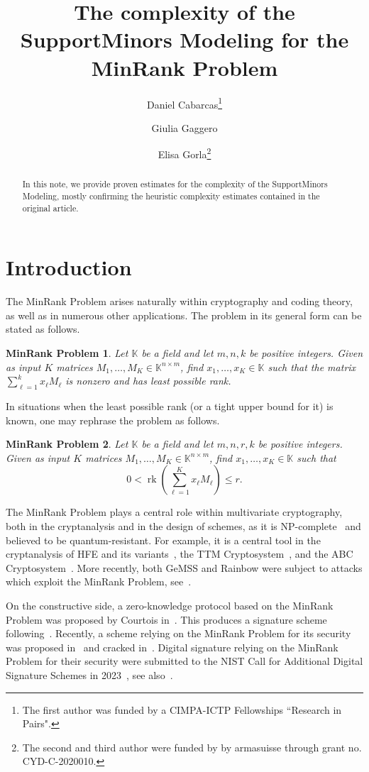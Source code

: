 \documentclass[utf8,latin1]{article}
\title{The complexity of the SupportMinors Modeling for the MinRank Problem}
\author{Daniel Cabarcas\footnote{The first author was funded by a CIMPA-ICTP Fellowships ``Research in Pairs".} \and Giulia Gaggero \and Elisa Gorla\thanks{The second and third author were funded by by armasuisse through grant no. CYD-C-2020010.}}
\date{}
\newtheorem*{mrpc}{MinRank Problem}
\DeclareMathOperator{\rk}{rk}
\newcommand{\KK}{\mathbb{K}}
\begin{document}
\maketitle

\begin{abstract} 
In this note, we provide proven estimates for the complexity of the SupportMinors Modeling, mostly confirming the heuristic complexity estimates contained in the original article.
\end{abstract}

\section{Introduction}

The MinRank Problem arises naturally within cryptography and coding theory, as well as in numerous other applications. The problem in its general form can be stated as follows.

\begin{mrpc}
Let $\KK$ be a field and let $m,n,k$ be positive integers. Given as input $K$ matrices $M_1,\dots,M_K\in\KK^{n\times m}$, find $x_1,\dots,x_K\in\KK$ such that the matrix $\sum_{\ell=1}^kx_\ell M_\ell$ is nonzero and has least possible rank. 
\end{mrpc}

In situations when the least possible rank (or a tight upper bound for it) is known, one may rephrase the problem as follows.

\begin{mrpc}
Let $\KK$ be a field and let $m,n,r,k$ be positive integers. Given as input $K$ matrices $M_1,\dots,M_K\in\KK^{n\times m}$, find $x_1,\dots,x_K\in\KK$ such that 
\[
0<\rk\left(\sum_{\ell=1}^K x_\ell M_\ell\right)\leq r.
\] 	 
\end{mrpc}

The MinRank Problem plays a central role within multivariate cryptography, both in the cryptanalysis and in the design of schemes, as it is NP-complete~\cite{BFS96} and believed to be quantum-resistant. For example, it is a central tool in the cryptanalysis of HFE and its variants~\cite{KS99, BFP13, CSV17, VS17, DPPS18}, the TTM Cryptosystem~\cite{GC00}, and the ABC Cryptosystem~\cite{MSP14, MPS17}. More recently, both GeMSS and Rainbow were subject to attacks which exploit the MinRank Problem, see~\cite{B21a,TPD21,BBCPSV21,B22}. 

On the constructive side, a zero-knowledge protocol based on the MinRank Problem was proposed by Courtois in~\cite{C01}. This produces a signature scheme following~\cite{FS87}. Recently, a scheme relying on the MinRank Problem for its security was proposed in~\cite{RLT21} and cracked in~\cite{BTV21}. Digital signature relying on the MinRank Problem for their security were submitted to the NIST Call for Additional Digital Signature Schemes in 2023~\cite{ARVBBESZ23-MiRitH,ABCFGNR23-MIRA}, see also~\cite{BESJ22}. 
\end{document}
